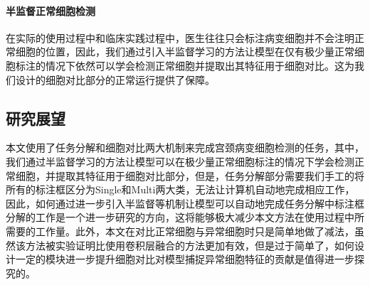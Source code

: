 \paragraph{半监督正常细胞检测}
\par 在实际的使用过程中和临床实践过程中，医生往往只会标注病变细胞并不会注明正常细胞的位置，因此，我们通过引入半监督学习的方法让模型在仅有极少量正常细胞标注的情况下依然可以学会检测正常细胞并提取出其特征用于细胞对比。这为我们设计的细胞对比部分的正常运行提供了保障。

\subsection{研究展望}
\par 本文使用了任务分解和细胞对比两大机制来完成宫颈病变细胞检测的任务，其中，我们通过半监督学习的方法让模型可以在极少量正常细胞标注的情况下学会检测正常细胞，并提取其特征用于细胞对比部分，但是，任务分解部分需要我们手工的将所有的标注框区分为Single和Multi两大类，无法让计算机自动地完成相应工作，因此，如何通过进一步引入半监督等机制让模型可以自动地完成任务分解中标注框分解的工作是一个进一步研究的方向，这将能够极大减少本文方法在使用过程中所需要的工作量。此外，本文在对比正常细胞与异常细胞时只是简单地做了减法，虽然该方法被实验证明比使用卷积层融合的方法更加有效，但是过于简单了，如何设计一定的模块进一步提升细胞对比对模型捕捉异常细胞特征的贡献是值得进一步探究的。
